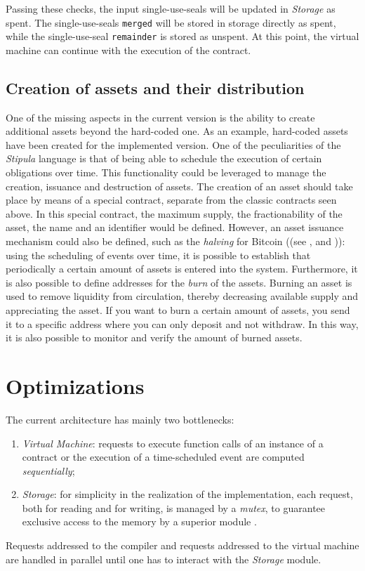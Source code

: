 Passing these checks, the input single-use-seals will be updated in \textit{Storage} as spent. The 
single-use-seals \verb|merged| will be stored in storage directly as spent, while the single-use-seal 
\verb|remainder| is stored as unspent. At this point, the virtual machine can continue with the execution of 
the contract.

\subsection{Creation of assets and their distribution}
\label{creation-assets-and-distribution}

One of the missing aspects in the current version is the ability to create additional assets beyond the 
hard-coded one. As an example, hard-coded assets have been created for the implemented version. One of the 
peculiarities of the \textit{Stipula} language is that of being able to schedule the execution of certain 
obligations over time. This functionality could be leveraged to manage the creation, issuance and 
destruction of assets. The creation of an asset should take place by means of a special contract, separate 
from the classic contracts seen above. In this special contract, the maximum supply, the fractionability of 
the asset, the name and an identifier would be defined. However, an asset issuance mechanism could also be 
defined, such as the \textit{halving} for Bitcoin ((see \cite{site:bitcoin-mining}, 
\cite{site:bitcoin-halving} and \cite{book:mastering-bitcoin})): using the scheduling of events over time, it is possible 
to establish that periodically a certain amount of assets is entered into the system. Furthermore, it is 
also possible to define addresses for the \textit{burn} of the assets. Burning an asset is used to remove 
liquidity from circulation, thereby decreasing available supply and appreciating the asset. If you want to 
burn a certain amount of assets, you send it to a specific address where you can only deposit and not 
withdraw. In this way, it is also possible to monitor and verify the amount of burned assets.

\newpage
\section{Optimizations}
\label{optimizations}

The current architecture has mainly two bottlenecks:
\begin{enumerate}
  \item \textit{Virtual Machine}: requests to execute function calls of an instance of a contract or the 
  execution of a time-scheduled event are computed \textit{sequentially};
  \item \textit{Storage}: for simplicity in the realization of the implementation, each request, both for 
  reading and for writing, is managed by a \textit{mutex}, to guarantee exclusive access to the memory by a 
  superior module .
\end{enumerate}
Requests addressed to the compiler and requests addressed to the virtual machine are handled in parallel 
until one has to interact with the \textit{Storage} module.

